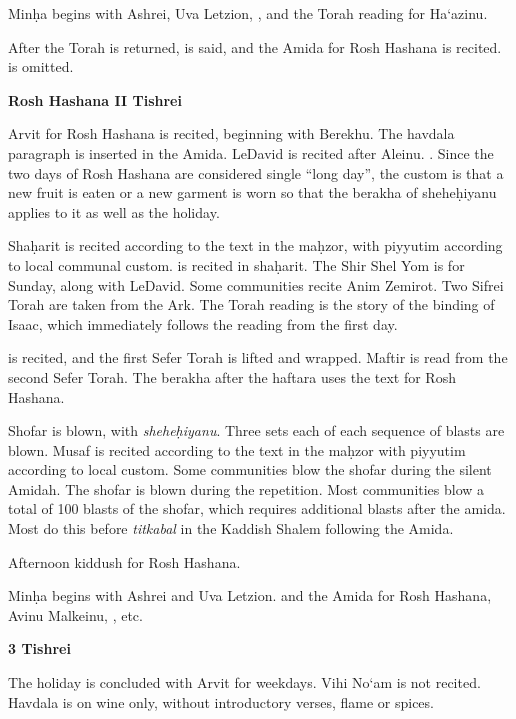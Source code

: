 {	Min\d{h}a begins with Ashrei, Uva Letzion, \halfkad , and the Torah reading for Ha`azinu. 
	
	\leinHaazinuweekday
	
	After the Torah is returned, \halfkad\space is said, and the Amida for Rosh Hashana is recited. \space is omitted.
	
	\textbf{Rosh Hashana II \textendash{} Tishrei}
	
	Arvit for Rosh Hashana is recited, beginning with Berekhu.  The havdala paragraph is inserted in the Amida.  LeDavid is recited after Aleinu. \yakenhaz . Since the two days of Rosh Hashana are considered single ``long day'', the custom is that a new fruit is eaten or a new garment is worn so that the berakha of shehe\d{h}iyanu applies to it as well as the holiday.
	
	Sha\d{h}arit is recited according to the text in the ma\d{h}zor, with piyyutim according to local communal custom.  is recited in sha\d{h}arit. The Shir Shel Yom is for Sunday, along with LeDavid.  Some communities recite Anim Zemirot.  Two Sifrei Torah are taken from the Ark.  The Torah reading is the story of the binding of Isaac, which immediately follows the reading from the first day.
	
	\leinRoshHashanaII
	
	\halfkad\space is recited, and the first Sefer Torah is lifted and wrapped. Maftir is read from the second Sefer Torah. \haftRoshHashanaII The berakha after the haftara uses the text for Rosh Hashana.
	
	Shofar is blown, with \textit{shehe\d{h}iyanu}. Three sets each of each sequence of blasts are blown.  Musaf is recited according to the text in the ma\d{h}zor with piyyutim according to local custom. Some communities blow the shofar during the silent Amidah.  The shofar is blown during the repetition.  Most communities blow a total of 100 blasts of the shofar, which requires additional blasts after the amida.  Most do this before \textit{titkabal} in the Kaddish Shalem following the Amida.
	
	Afternoon kiddush for Rosh Hashana.
	
	Min\d{h}a begins with Ashrei and Uva Letzion. \halfkad\space and the Amida for Rosh Hashana, Avinu Malkeinu, \fullkad , etc.
	
	\textbf{3 Tishrei}
	
	The holiday is concluded with Arvit for weekdays. Vihi No`am is not recited. Havdala is on wine only, without introductory verses, flame or spices.
}

